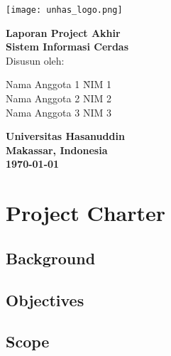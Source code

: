 \documentclass[a4paper,12pt]{report}
\begin{document}
\begin{titlepage}
    \centering
    \vspace*{1cm}
    
    \texttt{[image: unhas\_logo.png]}\\ %
    \vspace{1cm}
    
    {\Large \textbf{Laporan Project Akhir}}\\
    \vspace{0.5cm}
    {\Large \textbf{Sistem Informasi Cerdas}}\\
    
    \vfill
    Disusun oleh:
    
    \begin{tabbing}
        Nama Anggota 1 \hspace{1cm} \= NIM 1 \\
        Nama Anggota 2 \> NIM 2 \\
        Nama Anggota 3 \> NIM 3 \\
    \end{tabbing}
    
    \vfill
    
    \textbf{Universitas Hasanuddin}\\
    \textbf{Makassar, Indonesia}\\
    \textbf{\today}
    
\end{titlepage}

\tableofcontents
\newpage

\chapter{Project Charter}
\section{Background}

\section{Objectives}

\section{Scope}
\end{document}
